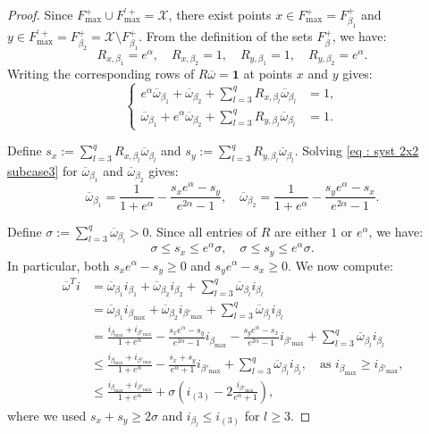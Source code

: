 \documentclass[a4paper, 11pt]{article}
\theoremstyle{definition}
\begin{document}
{\begin{proof}
Since $F^+_{\max} \cup F^{\prime +}_{\max} = \mathcal{X}$, there exist points $x \in F^+_{\max} = F^+_{\beta_1}$ and $y \in F^{\prime +}_{\max} = F^+_{\beta_2} = \mathcal{X} \setminus F^+_{\beta_1}$.  
From the definition of the sets $F^+_\beta$, we have:
\[
R_{x,\beta_1} = e^\alpha, \quad R_{x,\beta_2} = 1, \quad R_{y,\beta_1} = 1, \quad R_{y,\beta_2} = e^\alpha.
\]
Writing the corresponding rows of $R \overline{\omega} = \bm{1}$ at points $x$ and $y$ gives:
\begin{equation} \label{eq : syst 2x2 subcase3}
\left\{
\begin{aligned}
e^\alpha \overline{\omega}_{\beta_1} + \overline{\omega}_{\beta_2} + \sum_{l=3}^q R_{x,\beta_l}\overline{\omega}_{\beta_l} &= 1, \\
\overline{\omega}_{\beta_1} + e^\alpha \overline{\omega}_{\beta_2} + \sum_{l=3}^q R_{y,\beta_l}\overline{\omega}_{\beta_l} &= 1.
\end{aligned}
\right.
\end{equation}

Define $s_x := \sum_{l=3}^q R_{x,\beta_l}\overline{\omega}_{\beta_l}$ and $s_y := \sum_{l=3}^q R_{y,\beta_l}\overline{\omega}_{\beta_l}$.  
Solving \eqref{eq : syst 2x2 subcase3} for $\overline{\omega}_{\beta_1}$ and $\overline{\omega}_{\beta_2}$ gives:
\begin{equation} \label{eq : expression omega subcase 3}
\overline{\omega}_{\beta_1} = \frac{1}{1 + e^\alpha} - \frac{s_x e^\alpha - s_y}{e^{2\alpha} - 1}, \quad
\overline{\omega}_{\beta_2} = \frac{1}{1 + e^\alpha} - \frac{s_y e^\alpha - s_x}{e^{2\alpha} - 1}.
\end{equation}

Define $\sigma := \sum_{l=3}^q \overline{\omega}_{\beta_l} > 0$.  
Since all entries of $R$ are either $1$ or $e^\alpha$, we have:
\[
\sigma \le s_x \le e^\alpha \sigma, \quad \sigma \le s_y \le e^\alpha \sigma.
\]
In particular, both $s_x e^\alpha - s_y \ge 0$ and $s_y e^\alpha - s_x \ge 0$. We now compute:
\begin{align*}
\overline{\omega}^T i &= \overline{\omega}_{\beta_1} i_{\beta_1} + \overline{\omega}_{\beta_2} i_{\beta_2} + \sum_{l=3}^q \overline{\omega}_{\beta_l} i_{\beta_l} \\
&= \overline{\omega}_{\beta_1} i_{\beta_{\max}} + \overline{\omega}_{\beta_2} i_{\beta'_{\max}} + \sum_{l=3}^q \overline{\omega}_{\beta_l} i_{\beta_l} \\
&= \frac{i_{\beta_{\max}} + i_{\beta'_{\max}}}{1 + e^\alpha}
- \frac{s_x e^\alpha - s_y}{e^{2\alpha} - 1} i_{\beta_{\max}} 
- \frac{s_y e^\alpha - s_x}{e^{2\alpha} - 1} i_{\beta'_{\max}} 
+ \sum_{l=3}^q \overline{\omega}_{\beta_l} i_{\beta_l} \\
&\le \frac{i_{\beta_{\max}} + i_{\beta'_{\max}}}{1 + e^\alpha}
- \frac{s_x + s_y}{e^\alpha + 1} i_{\beta'_{\max}} 
+ \sum_{l=3}^q \overline{\omega}_{\beta_l} i_{\beta_l}, \quad 
\text{as $i_{\beta_{\max}} \ge i_{\beta'_{\max}}$,} \\
&\le \frac{i_{\beta_{\max}} + i_{\beta'_{\max}}}{1 + e^\alpha}
+ \sigma \left( i_{(3)} - 2 \frac{i_{\beta'_{\max}}}{e^\alpha + 1} \right),
\end{align*}
where we used $s_x + s_y \ge 2 \sigma$ and $i_{\beta_l} \le i_{(3)}$ for $l \ge 3$.


\end{proof}}
\end{document}
